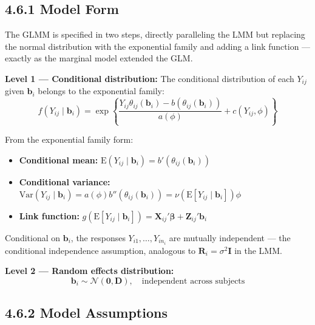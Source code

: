 \documentclass[11pt]{article}
\newcommand{\bbeta}{\boldsymbol{\beta}}
\newcommand{\E}{\mathrm{E}}
\newcommand{\Var}{\mathrm{Var}}
\newcommand{\Normal}{\mathcal{N}}
\begin{document}
\newpage

\begin{tcolorbox}[modelbox, title={Model 6: Generalized Linear Mixed Effects Model (GLMM)}]
\end{tcolorbox}

\subsection*{4.6.1 Model Form}

The GLMM is specified in two steps, directly paralleling the LMM but replacing the normal distribution with the exponential family and adding a link function --- exactly as the marginal model extended the GLM.

\textbf{Level 1 --- Conditional distribution:} The conditional distribution of each $Y_{ij}$ given $\mathbf{b}_i$ belongs to the exponential family:
$$f(Y_{ij} \mid \mathbf{b}_i) = \exp\left\{\frac{Y_{ij}\theta_{ij}(\mathbf{b}_i) - b(\theta_{ij}(\mathbf{b}_i))}{a(\phi)} + c(Y_{ij}, \phi)\right\}$$

From the exponential family form:
\begin{itemize}[leftmargin=2em]
  \item \textbf{Conditional mean:} $\E(Y_{ij} \mid \mathbf{b}_i) = b'(\theta_{ij}(\mathbf{b}_i))$
  \item \textbf{Conditional variance:} $\Var(Y_{ij} \mid \mathbf{b}_i) = a(\phi)b''(\theta_{ij}(\mathbf{b}_i)) = \nu(\E[Y_{ij} \mid \mathbf{b}_i])\phi$
  \item \textbf{Link function:} $g(\E[Y_{ij} \mid \mathbf{b}_i]) = \mathbf{X}_{ij}'\bbeta + \mathbf{Z}_{ij}'\mathbf{b}_i$
\end{itemize}

Conditional on $\mathbf{b}_i$, the responses $Y_{i1}, \ldots, Y_{in_i}$ are mutually independent --- the conditional independence assumption, analogous to $\mathbf{R}_i = \sigma^2\mathbf{I}$ in the LMM.

\textbf{Level 2 --- Random effects distribution:}
$$\mathbf{b}_i \sim \Normal(\mathbf{0}, \mathbf{D}), \quad \text{independent across subjects}$$

\subsection*{4.6.2 Model Assumptions}
\end{document}
